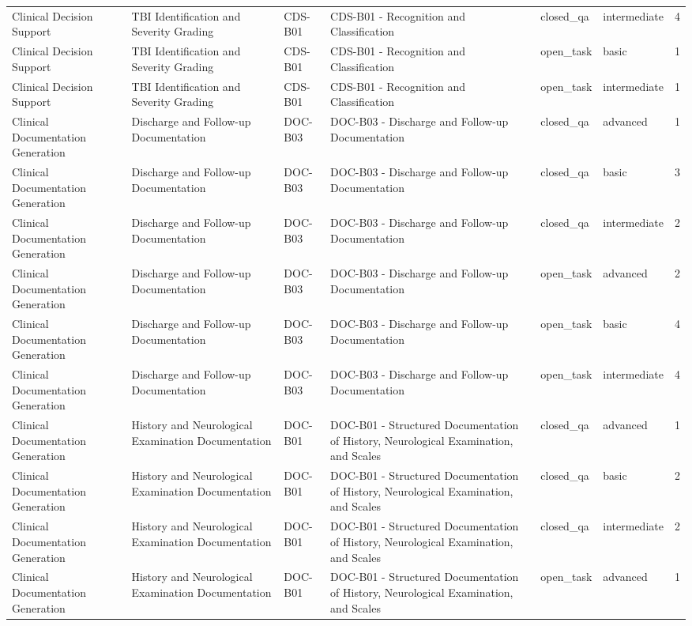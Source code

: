 \begin{tabular}{llllllr}
Clinical Decision Support & TBI Identification and Severity Grading & CDS-B01 & CDS-B01 - Recognition and Classification & closed_qa & intermediate & 4 \\
Clinical Decision Support & TBI Identification and Severity Grading & CDS-B01 & CDS-B01 - Recognition and Classification & open_task & basic & 1 \\
Clinical Decision Support & TBI Identification and Severity Grading & CDS-B01 & CDS-B01 - Recognition and Classification & open_task & intermediate & 1 \\
Clinical Documentation Generation & Discharge and Follow-up Documentation & DOC-B03 & DOC-B03 - Discharge and Follow-up Documentation & closed_qa & advanced & 1 \\
Clinical Documentation Generation & Discharge and Follow-up Documentation & DOC-B03 & DOC-B03 - Discharge and Follow-up Documentation & closed_qa & basic & 3 \\
Clinical Documentation Generation & Discharge and Follow-up Documentation & DOC-B03 & DOC-B03 - Discharge and Follow-up Documentation & closed_qa & intermediate & 2 \\
Clinical Documentation Generation & Discharge and Follow-up Documentation & DOC-B03 & DOC-B03 - Discharge and Follow-up Documentation & open_task & advanced & 2 \\
Clinical Documentation Generation & Discharge and Follow-up Documentation & DOC-B03 & DOC-B03 - Discharge and Follow-up Documentation & open_task & basic & 4 \\
Clinical Documentation Generation & Discharge and Follow-up Documentation & DOC-B03 & DOC-B03 - Discharge and Follow-up Documentation & open_task & intermediate & 4 \\
Clinical Documentation Generation & History and Neurological Examination Documentation & DOC-B01 & DOC-B01 - Structured Documentation of History, Neurological Examination, and Scales & closed_qa & advanced & 1 \\
Clinical Documentation Generation & History and Neurological Examination Documentation & DOC-B01 & DOC-B01 - Structured Documentation of History, Neurological Examination, and Scales & closed_qa & basic & 2 \\
Clinical Documentation Generation & History and Neurological Examination Documentation & DOC-B01 & DOC-B01 - Structured Documentation of History, Neurological Examination, and Scales & closed_qa & intermediate & 2 \\
Clinical Documentation Generation & History and Neurological Examination Documentation & DOC-B01 & DOC-B01 - Structured Documentation of History, Neurological Examination, and Scales & open_task & advanced & 1 \\

\end{tabular}
